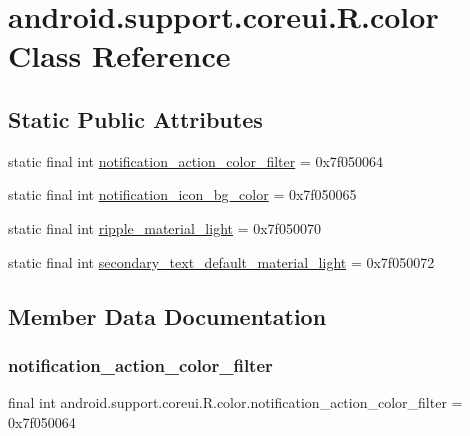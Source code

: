 \hypertarget{classandroid_1_1support_1_1coreui_1_1R_1_1color}{}\section{android.\+support.\+coreui.\+R.\+color Class Reference}
\label{classandroid_1_1support_1_1coreui_1_1R_1_1color}
\subsection*{Static Public Attributes}
\begin{DoxyCompactItemize}
\item 
static final int \mbox{\hyperlink{classandroid_1_1support_1_1coreui_1_1R_1_1color_a139f5da8e0332e3013b4dc87b2a9938d}{notification\+\_\+action\+\_\+color\+\_\+filter}} = 0x7f050064
\item 
static final int \mbox{\hyperlink{classandroid_1_1support_1_1coreui_1_1R_1_1color_a1b002af9f8cacca635aca4ce35f5a2d2}{notification\+\_\+icon\+\_\+bg\+\_\+color}} = 0x7f050065
\item 
static final int \mbox{\hyperlink{classandroid_1_1support_1_1coreui_1_1R_1_1color_a6749089d8e376ef1b30cb30a2659fbc3}{ripple\+\_\+material\+\_\+light}} = 0x7f050070
\item 
static final int \mbox{\hyperlink{classandroid_1_1support_1_1coreui_1_1R_1_1color_ae66a1bd3e1349c908b8345515b469985}{secondary\+\_\+text\+\_\+default\+\_\+material\+\_\+light}} = 0x7f050072
\end{DoxyCompactItemize}


\subsection{Member Data Documentation}
\mbox{\label{classandroid_1_1support_1_1coreui_1_1R_1_1color_a139f5da8e0332e3013b4dc87b2a9938d}} 
\subsubsection{\texorpdfstring{notification\+\_\+action\+\_\+color\+\_\+filter}{notification\_action\_color\_filter}}
{\footnotesize\ttfamily final int android.\+support.\+coreui.\+R.\+color.\+notification\+\_\+action\+\_\+color\+\_\+filter = 0x7f050064\hspace{0.3cm}{\ttfamily [static]}}

